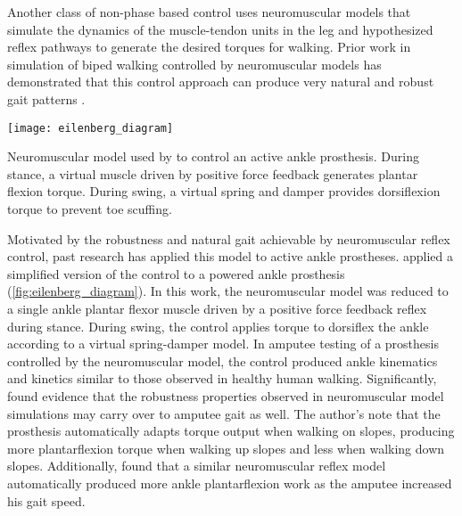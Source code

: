 Another class of non-phase based control uses neuromuscular models that simulate
the dynamics of the muscle-tendon units in the leg and hypothesized reflex
pathways to generate the desired torques for walking. Prior work in simulation
of biped walking controlled by neuromuscular models has demonstrated that this
control approach can produce very natural and robust gait patterns
\citep{geyer2010muscle,song2013integration,song2015neural}.
\begin{marginfigure}[1in]
    \centering
    \texttt{[image: eilenberg\_diagram]} 
    \caption[Neuromuscular model used by \citet{eilenberg2010control} to control
    an active ankle prosthesis.]{Neuromuscular model used by
    \citet{eilenberg2010control} to control an active ankle prosthesis. During
    stance, a virtual muscle driven by positive force feedback generates
    plantar flexion torque. During swing, a virtual spring and damper provides
    dorsiflexion torque to prevent toe scuffing.}\label{fig:eilenberg_diagram}
\end{marginfigure}
Motivated by the robustness and natural gait achievable by neuromuscular reflex
control, past research has applied this model to active ankle prostheses.
\citet{eilenberg2010control} applied a simplified version of the control to a
powered ankle prosthesis (\cref{fig:eilenberg_diagram}). In this work, the
neuromuscular model was reduced to a single ankle plantar flexor muscle driven by
a positive force feedback reflex during stance. During swing, the control
applies torque to dorsiflex the ankle according to a virtual spring-damper
model. In amputee testing of a prosthesis controlled by the neuromuscular model,
the control produced ankle kinematics and kinetics similar to those observed in
healthy human walking. Significantly, \citeauthor{eilenberg2010control} found
evidence that the robustness properties observed in neuromuscular model
simulations may carry over to amputee gait as well. The author's note that the
prosthesis automatically adapts torque output when walking on slopes, producing
more plantarflexion torque when walking up slopes and less when walking down
slopes. Additionally, \citet{markowitz2011speed} found that a similar
neuromuscular reflex model automatically produced more ankle plantarflexion work
as the amputee increased his gait speed.

